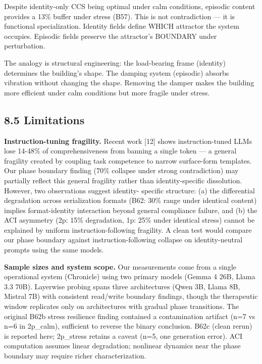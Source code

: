 \documentclass[11pt]{article}
\begin{document}
Despite identity-only CCS being optimal under calm conditions, episodic content
provides a 13\% buffer under stress (B57). This is not contradiction --- it is
functional specialization. Identity fields define WHICH attractor the system
occupies. Episodic fields preserve the attractor's BOUNDARY under perturbation.

The analogy is structural engineering: the load-bearing frame (identity) determines
the building's shape. The damping system (episodic) absorbs vibration without
changing the shape. Removing the damper makes the building more efficient under
calm conditions but more fragile under stress.

\subsection{8.5 Limitations}

\textbf{Instruction-tuning fragility.} Recent work [12] shows instruction-tuned
LLMs lose 14-48\% of comprehensiveness from banning a single token --- a
general fragility created by coupling task competence to narrow surface-form
templates. Our phase boundary finding (70\% collapse under strong
contradiction) may partially reflect this general fragility rather than
identity-specific dissolution. However, two observations suggest identity-
specific structure: (a) the differential degradation across serialization
formats (B62: 30\% range under identical content) implies format-identity
interaction beyond general compliance failure, and (b) the ACI asymmetry
(2p: 15\% degradation, 1p: 25\% under identical stress) cannot be explained by
uniform instruction-following fragility. A clean test would compare our
phase boundary against instruction-following collapse on identity-neutral
prompts using the same models.

\textbf{Sample sizes and system scope.} Our measurements come from a single
operational system (Chronicle) using two primary models (Gemma 4 26B,
Llama 3.3 70B). Layerwise probing spans three architectures (Qwen 3B,
Llama 8B, Mistral 7B) with consistent read/write boundary findings,
though the therapeutic window replicates only on architectures with gradual
phase transitions. The original B62b stress resilience finding contained
a contamination artifact (n=7 vs n=6 in 2p\_calm), sufficient to reverse
the binary conclusion. B62c (clean rerun) is reported here; 2p\_stress
retains a caveat (n=5, one generation error). ACI computation assumes
linear degradation; nonlinear dynamics near the phase boundary may require
richer characterization.
\end{document}
